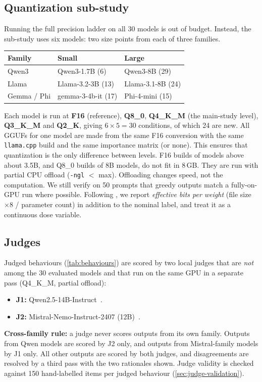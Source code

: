 \subsection{Quantization sub-study}
\label{sec:quant-design}
Running the full precision ladder on all 30 models is out of budget. Instead, the
sub-study uses six models: two size points from each of three families.
\begin{center}
\small
\begin{tabular}{@{}lll@{}}
\toprule
Family & Small & Large \\
\midrule
Qwen3     & Qwen3-1.7B (6)     & Qwen3-8B (29) \\
Llama     & Llama-3.2-3B (13)  & Llama-3.1-8B (24) \\
Gemma / Phi & gemma-3-4b-it (17) & Phi-4-mini (15) \\
\bottomrule
\end{tabular}
\end{center}
Each model is run at \textbf{F16} (reference), \textbf{Q8\_0}, \textbf{Q4\_K\_M}
(the main-study level), \textbf{Q3\_K\_M} and \textbf{Q2\_K}, giving
$6 \times 5 = 30$ conditions, of which 24 are new. All GGUFs for one model are made
from the same F16 conversion with the same \texttt{llama.cpp} build and the same
importance matrix (or none). This ensures that quantization is the only difference
between levels. F16 builds of models above about 3.5B, and Q8\_0 builds of 8B models,
do not fit in 8\,GB. They are run with partial CPU offload (\texttt{-ngl} $<$ max).
Offloading changes speed, not the computation. We still verify on 50 prompts that
greedy outputs match a fully-on-GPU run where possible. Following
\citet{ferrara2026quantibias}, we report \emph{effective bits per weight} (file size
$\times 8$ / parameter count) in addition to the nominal label, and treat it as a
continuous dose variable.

\subsection{Judges}
\label{sec:judges}
Judged behaviours (\cref{tab:behaviours}) are scored by two local judges that are
\emph{not} among the 30 evaluated models and that run on the same GPU in a separate
pass (Q4\_K\_M, partial offload):
\begin{itemize}[leftmargin=1.5em,itemsep=1pt]
  \item \textbf{J1:} Qwen2.5-14B-Instruct~\citep{qwen2025qwen25}.
  \item \textbf{J2:} Mistral-Nemo-Instruct-2407 (12B)~\citep{mistral2024nemo}.
\end{itemize}
\textbf{Cross-family rule:} a judge never scores outputs from its own family. Outputs
from Qwen models are scored by J2 only, and outputs from Mistral-family models by J1
only. All other outputs are scored by both judges, and disagreements are resolved by
a third pass with the two rationales shown. Judge validity is checked against
150 hand-labelled items per judged behaviour (\cref{sec:judge-validation}).
